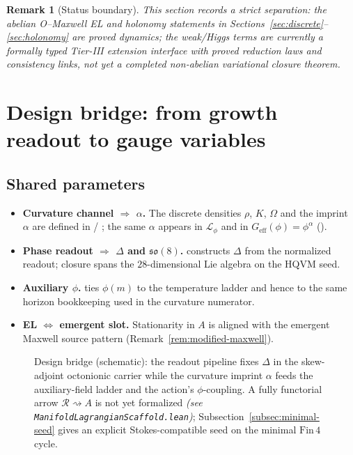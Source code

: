 \documentclass[11pt]{amsart}
\newtheorem{remark}[theorem]{Remark}
\begin{document}
\begin{remark}[Status boundary]
This section records a strict separation: the abelian O--Maxwell EL and holonomy statements in Sections~\ref{sec:discrete}--\ref{sec:holonomy} are proved dynamics; the weak/Higgs terms are currently a formally typed Tier-III extension interface with proved reduction laws and consistency links, not yet a completed non-abelian variational closure theorem.
\end{remark}

\section{Design bridge: from growth readout to gauge variables}
\label{sec:bridge}

\subsection{Shared parameters}

\begin{itemize}
\item \textbf{Curvature channel \(\Rightarrow\) \(\alpha\).} The discrete densities \(\rho\), \(K\), \(\Omega\) and the imprint \(\alpha\) are defined in  / ; the same \(\alpha\) appears in \(\mathcal{L}_\phi\) and in \(G_{\mathrm{eff}}(\phi)=\phi^{\alpha}\) ().
\item \textbf{Phase readout \(\Rightarrow\) \(\Delta\) and \(\mathfrak{so}(8)\).} \cite{hqiv-so8-paper} constructs \(\Delta\) from the normalized readout; closure spans the \(28\)-dimensional Lie algebra on the HQVM seed.
\item \textbf{Auxiliary \(\phi\).}  ties \(\phi(m)\) to the temperature ladder and hence to the same horizon bookkeeping used in the curvature numerator.
\item \textbf{EL \(\Leftrightarrow\) emergent slot.} Stationarity in \(A\) is aligned with the emergent Maxwell source pattern (Remark~\ref{rem:modified-maxwell}).
\end{itemize}

\begin{figure}[ht]
\centering
{}
\caption{Design bridge (schematic): the readout pipeline fixes \(\Delta\) in the skew-adjoint octonionic carrier while the curvature imprint \(\alpha\) feeds the auxiliary-field ladder and the action's \(\phi\)-coupling. A fully functorial arrow \(\mathcal{R}\rightsquigarrow A\) is not yet formalized \emph{(see \texttt{ManifoldLagrangianScaffold.lean})}; Subsection~\ref{subsec:minimal-seed} gives an explicit Stokes-compatible seed on the minimal \(\mathrm{Fin}\,4\) cycle.}
\label{fig:bridge}
\end{figure}
\end{document}
